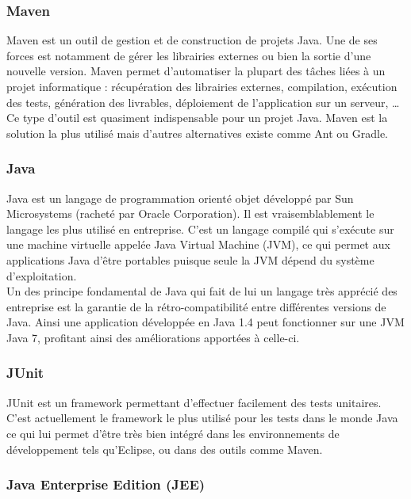 \subsubsection{Maven}

Maven \cite{maven} est un outil de gestion et de construction de projets Java. Une de ses forces est notamment de gérer les librairies externes ou bien la sortie d'une nouvelle version. Maven permet d'automatiser la plupart des tâches liées à un projet informatique : récupération des librairies externes, compilation, exécution des tests, génération des livrables, déploiement de l'application sur un serveur, \dots Ce type d'outil est quasiment indispensable pour un projet Java. Maven est la solution la plus utilisé mais d'autres alternatives existe comme Ant ou Gradle. 

\subsubsection{Java}

Java \cite{java} est un langage de programmation orienté objet développé par Sun Microsystems (racheté par Oracle Corporation). Il est vraisemblablement le langage les plus utilisé en entreprise. C'est un langage compilé qui s'exécute sur une machine virtuelle appelée Java Virtual Machine (JVM), ce qui permet aux applications Java d'être portables puisque seule la JVM dépend du système d'exploitation.\\

Un des principe fondamental de Java qui fait de lui un langage très apprécié des entreprise est la garantie de la rétro-compatibilité entre différentes versions de Java. Ainsi une application développée en Java 1.4 peut fonctionner sur une JVM Java 7, profitant ainsi des améliorations apportées à celle-ci.

\subsubsection{JUnit}

JUnit \cite{junit} est un framework permettant d'effectuer facilement des tests unitaires. C'est actuellement le framework le plus utilisé pour les tests dans le monde Java ce qui lui permet d'être très bien intégré dans les environnements de développement tels qu'Eclipse, ou dans des outils comme Maven.

\subsubsection{Java Enterprise Edition (JEE)}

